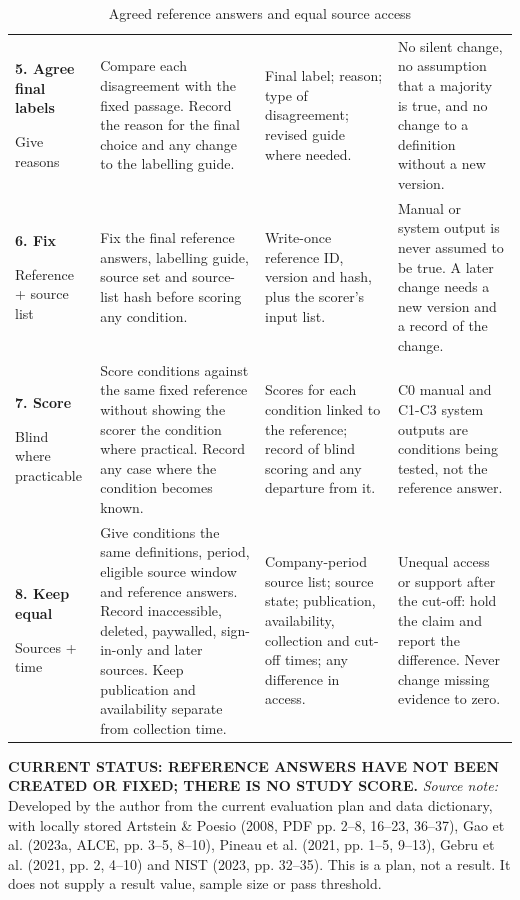 \begin{table}[p]
\begin{tabularx}{\textwidth}{@{}P{0.15\textwidth}P{0.38\textwidth}P{0.19\textwidth}Y@{}}
    \addlinespace[1.5pt]
    \textbf{5. Agree final labels}\par Give reasons &
    Compare each disagreement with the fixed passage. Record the reason for the final choice and any change to the labelling guide. &
    Final label; reason; type of disagreement; revised guide where needed. &
    No silent change, no assumption that a majority is true, and no change to a definition without a new version. \\

    \addlinespace[1.5pt]
    \textbf{6. Fix}\par Reference + source list &
    Fix the final reference answers, labelling guide, source set and source-list hash before scoring any condition. &
    Write-once reference ID, version and hash, plus the scorer's input list. &
    Manual or system output is never assumed to be true. A later change needs a new version and a record of the change. \\

    \addlinespace[1.5pt]
    \textbf{7. Score}\par Blind where practicable &
    Score conditions against the same fixed reference without showing the scorer the condition where practical. Record any case where the condition becomes known. &
    Scores for each condition linked to the reference; record of blind scoring and any departure from it. &
    C0 manual and C1-C3 system outputs are conditions being tested, not the reference answer. \\

    \addlinespace[1.5pt]
    \textbf{8. Keep equal}\par Sources + time &
    Give conditions the same definitions, period, eligible source window and reference answers. Record inaccessible, deleted, paywalled, sign-in-only and later sources. Keep publication and availability separate from collection time. &
    Company-period source list; source state; publication, availability, collection and cut-off times; any difference in access. &
    Unequal access or support after the cut-off: hold the claim and report the difference. Never change missing evidence to zero. \\
    \bottomrule
  \end{tabularx}

  \caption{Agreed reference answers and equal source access}
  \label{tab:meth-reference-parity-matrix}

  \vspace{5pt}
  \parbox{\textwidth}{\RaggedRight\scriptsize
    \textbf{CURRENT STATUS: REFERENCE ANSWERS HAVE NOT BEEN CREATED OR FIXED; THERE IS NO STUDY SCORE.}
    \textit{Source note:} Developed by the author from the current evaluation plan and data dictionary,
    with locally stored Artstein \& Poesio (2008, PDF pp. 2--8, 16--23, 36--37), Gao et al.
    (2023a, ALCE, pp. 3--5, 8--10), Pineau et al. (2021, pp. 1--5, 9--13), Gebru et al.
    (2021, pp. 2, 4--10) and NIST (2023, pp. 32--35). This is a plan, not a result. It does not
    supply a result value, sample size or pass threshold.}
\end{table}
\clearpage
